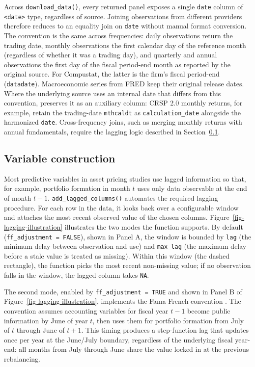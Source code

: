 \documentclass[
  article]{jss}
\begin{document}
Across \texttt{download\_data()}, every returned panel exposes a single
\texttt{date} column of \texttt{\textless{}date\textgreater{}} type,
regardless of source. Joining observations from different providers
therefore reduces to an equality join on \texttt{date} without manual
format conversion. The convention is the same across frequencies: daily
observations return the trading date, monthly observations the first
calendar day of the reference month (regardless of whether it was a
trading day), and quarterly and annual observations the first day of the
fiscal period-end month as reported by the original source. For
Compustat, the latter is the firm's fiscal period-end
(\texttt{datadate}). Macroeconomic series from FRED keep their original
release dates. Where the underlying source uses an internal date that
differs from this convention,  preserves it as an
auxiliary column: CRSP 2.0 monthly returns, for example, retain the
trading-date \texttt{mthcaldt} as \texttt{calculation\_date} alongside
the harmonized \texttt{date}. Cross-frequency joins, such as merging
monthly returns with annual fundamentals, require the lagging logic
described in Section~\ref{sec-variable-construction}.

\subsection{Variable construction}\label{sec-variable-construction}

Most predictive variables in asset pricing studies use lagged
information so that, for example, portfolio formation in month \(t\)
uses only data observable at the end of month \(t-1\).
\texttt{add\_lagged\_columns()} automates the required lagging
procedure. For each row in the data, it looks back over a configurable
window and attaches the most recent observed value of the chosen
columns. Figure~\ref{fig-lagging-illustration} illustrates the two modes
the function supports. By default (\texttt{ff\_adjustment\ =\ FALSE}),
shown in Panel A, the window is bounded by \texttt{lag} (the minimum
delay between observation and use) and \texttt{max\_lag} (the maximum
delay before a stale value is treated as missing). Within this window
(the dashed rectangle), the function picks the most recent non-missing
value; if no observation falls in the window, the lagged column takes
\texttt{NA}.

The second mode, enabled by \texttt{ff\_adjustment\ =\ TRUE} and shown
in Panel B of Figure~\ref{fig-lagging-illustration}, implements the
Fama-French convention \citep{fama.1993}. The convention assumes
accounting variables for fiscal year \(t-1\) become public information
by June of year \(t\), then uses them for portfolio formation from July
of \(t\) through June of \(t+1\). This timing produces a step-function
lag that updates once per year at the June/July boundary, regardless of
the underlying fiscal year-end: all months from July through June share
the value locked in at the previous rebalancing.
\end{document}
